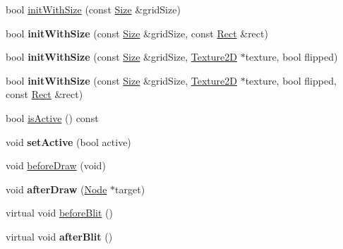 \textbf{ }\par
\begin{DoxyCompactItemize}
\item 
bool \hyperlink{classGridBase_a6954ba2038e8b821dbdf58c958b5f175}{init\+With\+Size} (const \hyperlink{classSize}{Size} \&grid\+Size)
\item 
\mbox{\label{classGridBase_adecb551bd76a4fcf8515bb27c999ccac}} 
bool {\bfseries init\+With\+Size} (const \hyperlink{classSize}{Size} \&grid\+Size, const \hyperlink{classRect}{Rect} \&rect)
\item 
\mbox{\label{classGridBase_a1cb52b35b7144f88ce0d511c671ff645}} 
bool {\bfseries init\+With\+Size} (const \hyperlink{classSize}{Size} \&grid\+Size, \hyperlink{classTexture2D}{Texture2D} $\ast$texture, bool flipped)
\item 
\mbox{\label{classGridBase_adacfc703d86cdd323253fab2e94b6dbe}} 
bool {\bfseries init\+With\+Size} (const \hyperlink{classSize}{Size} \&grid\+Size, \hyperlink{classTexture2D}{Texture2D} $\ast$texture, bool flipped, const \hyperlink{classRect}{Rect} \&rect)
\end{DoxyCompactItemize}

\textbf{ }\par
\begin{DoxyCompactItemize}
\item 
bool \hyperlink{classGridBase_a700fb3a795e9d60384e59944db015159}{is\+Active} () const
\item 
\mbox{\label{classGridBase_ab088275c2f3b49e29d1b103ce80709a7}} 
void {\bfseries set\+Active} (bool active)
\end{DoxyCompactItemize}

\textbf{ }\par
\begin{DoxyCompactItemize}
\item 
void \hyperlink{classGridBase_a975ccffbff789ff39092cb9dceb99657}{before\+Draw} (void)
\item 
\mbox{\label{classGridBase_a3dfda94249531459f40976c69f186150}} 
void {\bfseries after\+Draw} (\hyperlink{classNode}{Node} $\ast$target)
\end{DoxyCompactItemize}

\textbf{ }\par
\begin{DoxyCompactItemize}
\item 
virtual void \hyperlink{classGridBase_a04ceef221be29f561d00bd10ae7dc13a}{before\+Blit} ()
\item 
\mbox{\label{classGridBase_abf100b0b02564350a8ae0c2170094812}} 
virtual void {\bfseries after\+Blit} ()
\end{DoxyCompactItemize}

